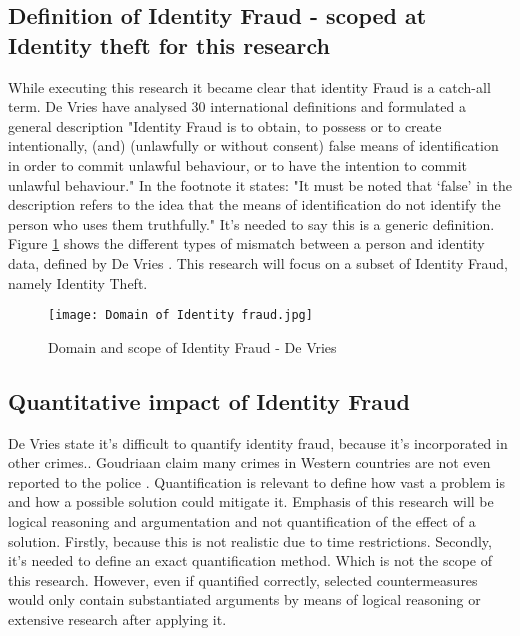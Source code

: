 \subsection{Definition of Identity Fraud - scoped at Identity theft for this research}
While executing this research it became clear that identity Fraud is a catch-all term. De Vries \etal \cite{97408536fd1c4f4e9d1615b7a4a4473e} have analysed 30 international definitions and formulated a general description "Identity Fraud is to obtain, to possess or to create intentionally, (and) (unlawfully or without consent) false means of identification
in order to commit unlawful behaviour, or to have the intention to commit unlawful behaviour." In the footnote it states: "It must be noted that ‘false’ in the description refers to the idea that the means of identification do not identify the person who uses them truthfully." It's needed to say this is a generic definition. Figure \ref{fig:ID_fraud} shows the different types of mismatch between a person and identity data, defined by De Vries \etal \cite{Vries2007IdentiteitsfraudeEA}. This research will focus on a subset of Identity Fraud, namely Identity Theft.
\graphicspath{ {./images/} }
\begin{figure}
\texttt{[image: Domain of Identity fraud.jpg]}\\
\caption{Domain and scope of Identity Fraud - De Vries \etal \cite{Vries2007IdentiteitsfraudeEA}}
\label{fig:ID_fraud}
\end{figure}

\subsection{Quantitative impact of Identity Fraud}\label{QI}
De Vries \etal state it's difficult to quantify identity fraud, because it's incorporated in other crimes.\cite{Vries2007IdentiteitsfraudeEA}. Goudriaan \etal claim many crimes in Western countries are not even reported to the police \cite{Gourdriaan_etal}. Quantification is relevant to define how vast a problem is and how a possible solution could mitigate it. Emphasis of this research will be logical reasoning and argumentation and not quantification of the effect of a solution. Firstly, because this is not realistic due to time restrictions. Secondly, it's needed to define an exact quantification method. Which is not the scope of this research. However, even if quantified correctly, selected countermeasures would only contain substantiated arguments by means of logical reasoning or extensive research after applying it.

